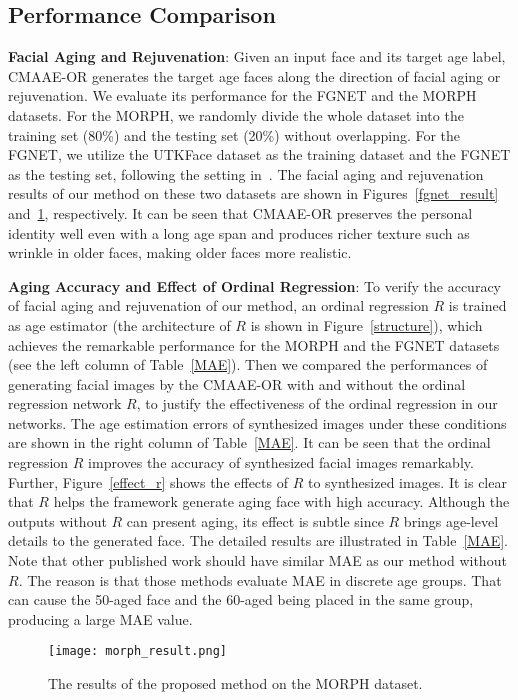 \documentclass{article}
\begin{document}
\subsection{Performance Comparison}
{\bf\noindent Facial Aging and Rejuvenation}:
Given an input face and its target age label, CMAAE-OR generates the target age faces along the direction of facial aging or rejuvenation. We evaluate its performance for the FGNET and the MORPH datasets. For the MORPH, we randomly divide the whole dataset into the training set (80\%) and the testing set (20\%) without overlapping. For the FGNET, we utilize the UTKFace dataset as the training dataset and the FGNET as the testing set, following the setting in~\cite{zhang2017age}. The facial aging and rejuvenation results of our method on these two datasets are shown in Figures~\ref{fgnet_result} and~\ref{morph_resutl}, respectively. It can be seen that CMAAE-OR preserves the personal identity well even with a long age span and produces richer texture such as wrinkle in older faces, making older faces more realistic. 

{\bf\noindent Aging Accuracy and Effect of Ordinal Regression}:
To verify the accuracy of facial aging and rejuvenation of our method, an ordinal regression $R$ is trained as age estimator (the architecture of $R$ is shown in Figure~\ref{structure}), which achieves the remarkable performance for the MORPH and the FGNET datasets (see the left column of Table~\ref{MAE}). Then we compared the performances of generating facial images by the CMAAE-OR with and without the ordinal regression network $R$, to justify the effectiveness of the ordinal regression in our networks. The age estimation errors of synthesized images under these conditions are shown in the right column of Table~\ref{MAE}. It can be seen that the ordinal regression $R$ improves the accuracy of synthesized facial images remarkably. Further, Figure~\ref{effect_r} shows the effects of $R$ to synthesized images. It is clear that $R$ helps the framework generate aging face with high accuracy. Although the outputs without $R$ can present aging, its effect is subtle since $R$ brings age-level details to the generated face. The detailed results are illustrated in Table~\ref{MAE}. Note that other published work should have similar MAE as our method without $R$. The reason is that those methods evaluate MAE in discrete age groups. That can cause the 50-aged face and the 60-aged being placed in the same group, producing a large MAE value.  

\begin{figure}[!ht]
\centering
\texttt{[image: morph\_result.png]}
\caption{The results of the proposed method on the MORPH dataset.}
\label{morph_resutl}
\end{figure}
\end{document}

